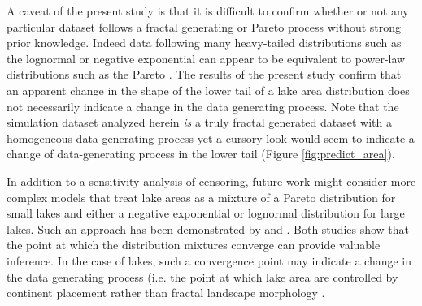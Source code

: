 \documentclass{article}
\begin{document}
A caveat of the present study is that it is difficult to confirm whether or not any particular dataset follows a fractal generating or Pareto process without strong prior knowledge. Indeed data following many heavy-tailed distributions such as the lognormal or negative exponential can appear to be equivalent to power-law distributions such as the Pareto \citep{clausetPowerlawDistributionsEmpirical2009}. The results of the present study confirm that an apparent change in the shape of the lower tail of a lake area distribution does not necessarily indicate a change in the data generating process. Note that the simulation dataset analyzed herein \emph{is} a truly fractal generated dataset with a homogeneous data generating process yet a cursory look would seem to indicate a change of data-generating process in the lower tail (Figure \ref{fig:predict_area}).

In addition to a sensitivity analysis of censoring, future work might consider more complex models that treat lake areas as a mixture of a Pareto distribution for small lakes and either a negative exponential or lognormal distribution for large lakes. Such an approach has been demonstrated by \citet{bonabeau_scaling_1999-1} and \citet{scollnikCompositeLognormalParetoModels2007}. Both studies show that the point at which the distribution mixtures converge can provide valuable inference. In the case of lakes, such a convergence point may indicate a change in the data generating process (i.e. the point at which lake area are controlled by continent placement rather than fractal landscape morphology \citep{goodchildLakesFractalSurfaces1988, hamiltonEstimationFractalDimension1992}.



\end{document}

